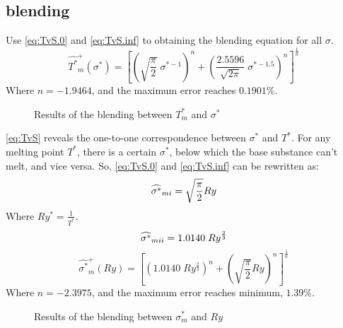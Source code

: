 \documentclass[review, 1p, number, sort&compress,table]{elsarticle}
\begin{document}
	\subsection{blending}
	Use \autoref{eq:TvS.0} and  \autoref{eq:TvS.inf} to obtaining the blending equation for all $\sigma$.
	\begin{equation} \label{eq:TvS}
		\widehat{T^{*}}_m^+ \left(\sigma^*\right)
		=\left[ \left( \sqrt{\frac{\pi}{2}}    \; \sigma^{*-1}\right)^n+ \left(\frac{2.5596}{\sqrt{2\pi}} \; \sigma^{*-1.5}\right)^n\right]^{\frac{1}{n}}
	\end{equation}
	Where $n=-1.9464$, and the maximum error reaches $0.1901\%$. \\
		\begin{figure*}[ht!]
			\begin{center}
			\end{center}
			\caption{Results of the blending between $T^*_m$ and $\sigma^{*}$  }
			\label{fig:A.TvS}
		\end{figure*}

	\autoref{eq:TvS} reveals the one-to-one correspondence between $\sigma^*$ and $T^{*}$. For any melting point $T^*$, there is a certain $\sigma^{*}$, below which the base substance can't melt, and vice versa. So, \autoref{eq:TvS.0} and \autoref{eq:TvS.inf} can be rewritten as:
	\begin{equation}  \label{eq:SvT.0}
		\widehat{\sigma^{*}}_{m\uppercase\expandafter{\romannumeral1}}
		=\sqrt{\frac{\pi}{2}}Ry
	\end{equation}
	Where $Ry^{*}=\frac{1}{T^{*}}$.  \\
	\begin{equation}  \label{eq:SvT.inf}
		\widehat{\sigma^{*}}_{m\uppercase\expandafter{\romannumeral2}}=1.0140 \; Ry^{\frac{2}{3}}
	\end{equation}
	\begin{equation}  \label{eq:SvT}
		\widehat{\sigma^{*}}_{m}^+ \left(Ry\right)
		=\left[ \left( 1.0140 \; Ry^{\frac{2}{3}}\right)^n+ \left( \sqrt{\frac{\pi}{2}}Ry\right)^n\right]^\frac{1}{n}
	\end{equation}
	Where $n=-2.3975$, and the maximum error reaches minimum, $1.39\%$.
			\begin{figure*}[ht!]
				\begin{center}
				\end{center}
				\caption{Results of the blending between $\sigma^*_m$ and $Ry$  }
				\label{fig:A.SvR}
			\end{figure*}
			\\
			
\end{document}
